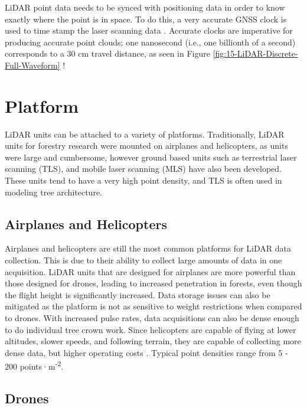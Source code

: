 \documentclass[
]{book}
\begin{document}
LiDAR point data needs to be synced with positioning data in order to know exactly where the point is in space. To do this, a very accurate GNSS clock is used to time stamp the laser scanning data \citep{uf_geomatics_-_fort_lauderdale_lidar_2016-1}. Accurate clocks are imperative for producing accurate point clouds; one nanosecond (i.e., one billionth of a second) corresponds to a 30 cm travel distance, as seen in Figure \ref{fig:15-LiDAR-Discrete-Full-Waveform} \citep{uf_geomatics_-_fort_lauderdale_lidar_2016-2}!

\hypertarget{platform}{%
\section{Platform}\label{platform}}

LiDAR units can be attached to a variety of platforms. Traditionally, LiDAR units for forestry research were mounted on airplanes and helicopters, as units were large and cumbersome, however ground based units such as terrestrial laser scanning (TLS), and mobile laser scanning (MLS) have also been developed. These units tend to have a very high point density, and TLS is often used in modeling tree architecture.

\hypertarget{airplanes-and-helicopters}{%
\subsection{Airplanes and Helicopters}\label{airplanes-and-helicopters}}

Airplanes and helicopters are still the most common platforms for LiDAR data collection. This is due to their ability to collect large amounts of data in one acquisition. LiDAR units that are designed for airplanes are more powerful than those designed for drones, leading to increased penetration in forests, even though the flight height is significantly increased. Data storage issues can also be mitigated as the platform is not as sensitive to weight restrictions when compared to drones. With increased pulse rates, data acquisitions can also be dense enough to do individual tree crown work. Since helicopters are capable of flying at lower altitudes, slower speeds, and following terrain, they are capable of collecting more dense data, but higher operating costs \citep{white_best_2013}. Typical point densities range from 5 - 200 points·m\textsuperscript{-2}.

\hypertarget{drones}{%
\subsection{Drones}\label{drones}}
\end{document}
